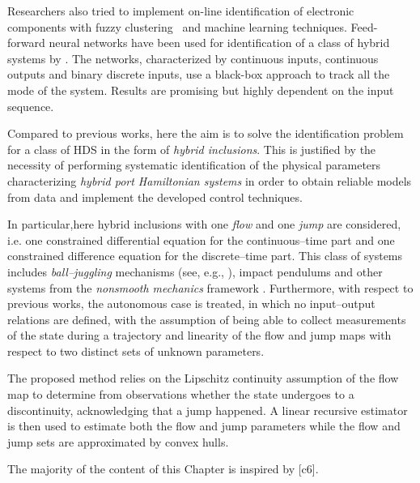 %
Researchers also tried to implement on-line identification of electronic components with fuzzy clustering~\citep{sepasi2008line} and machine learning techniques.
Feed-forward neural networks have been used for identification of a class of hybrid systems by \cite{Messai,MESSAI2006217}. The networks, characterized by continuous inputs, continuous outputs and binary discrete inputs, use a black-box approach to track all the mode of the system. Results are promising but highly dependent on the input sequence.
%
\newline

%
Compared to previous works, here the aim is to solve the identification problem for a class of HDS in the form of \textit{hybrid inclusions}. This is justified by the necessity of performing systematic identification of the physical parameters characterizing \textit{hybrid port Hamiltonian systems} in order to obtain reliable models from data and implement the developed control techniques.
%
\newline

%
In particular,here hybrid inclusions with one \textit{flow} and one \textit{jump} are considered, i.e. one constrained differential equation for the continuous--time part and one constrained difference equation for the discrete--time part. This class of systems includes \textit{ball--juggling} mechanisms (see, e.g., \citealp{tian2013}), impact pendulums and other systems from the \textit{nonsmooth mechanics} framework \citep{brogliato1999nonsmooth}. Furthermore, with respect to previous works, the autonomous case is treated, in which no input--output relations are defined, with the assumption of being able to collect measurements of the state during a trajectory and linearity of the flow and jump maps with respect to two distinct sets of unknown parameters. 
%
\newline

%
The proposed method relies on the Lipschitz continuity assumption of the flow map to determine from observations whether the state undergoes to a discontinuity, acknowledging that a jump happened. 
A linear recursive estimator is then used to estimate both the flow and jump parameters while the flow and jump sets are approximated by convex hulls.
%
\newline

%
%
The majority of the content of this Chapter is inspired by [c6].
%
